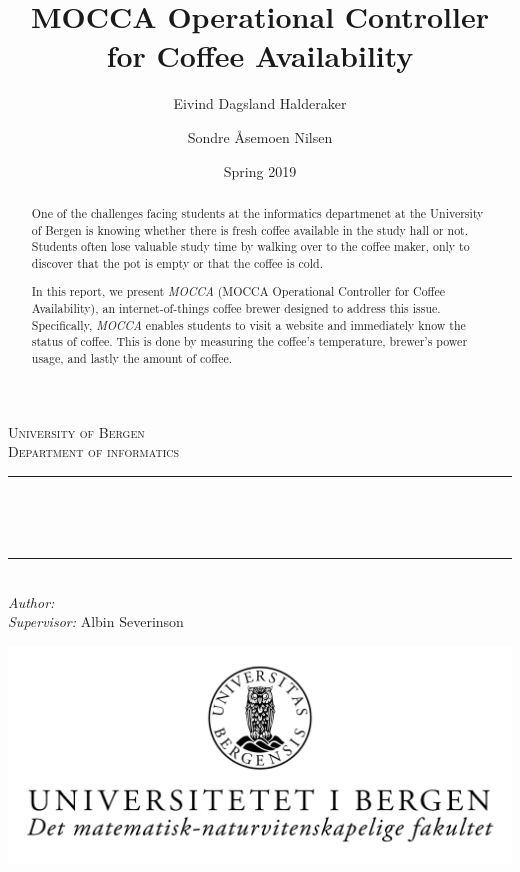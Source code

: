 \documentclass[12pt,a4paper,oneside,article]{memoir}
\title{MOCCA Operational Controller for Coffee Availability}
\author{Eivind Dagsland Halderaker \and Sondre Åsemoen Nilsen}
\date{Spring 2019}
\numberwithin{equation}{chapter}
\begin{document}
\begin{titlingpage}

\newcommand{\HRule}{\rule{\linewidth}{0.5mm}}
\centering

\textsc{\LARGE University of Bergen \\ Department of informatics}\\[1.5cm] %

\HRule\\[0.5cm]
\begin{Huge}
	\bfseries{\thetitle}\\[0.7cm]
\end{Huge}
\HRule\\[0.5cm]

{\large \emph{Author:} \theauthor}\\
{\large \emph{Supervisor:} Albin Severinson\\[2cm]}

\centerline{\includegraphics[scale=1.9]{figures/canvasWithFaculty}}
{\large \thedate}\\[3cm]
\vfill

\begin{abstract}
One of the challenges facing students at the informatics departmenet at the 
University of Bergen is knowing whether there is fresh coffee available in the 
study hall or not.  Students often lose valuable study time by walking over to 
the coffee maker, only to discover that the pot is empty or that the coffee is 
cold.

In this report, we present \textit{MOCCA} (MOCCA Operational Controller for
Coffee Availability), an internet-of-things coffee brewer designed to address
this issue. Specifically, \textit{MOCCA} enables students to visit a website and
immediately know the status of coffee. This is done by measuring the coffee's
temperature, brewer's power usage, and lastly the amount of coffee.
\end{abstract}
\end{titlingpage}
\end{document}

